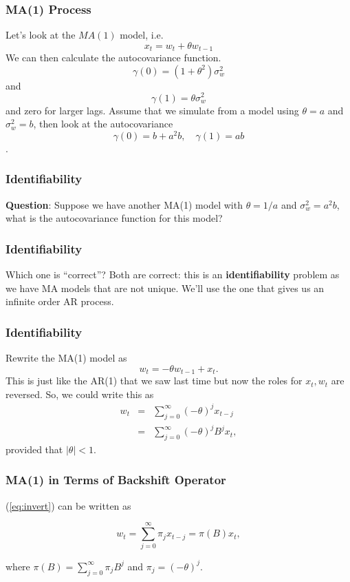 \documentclass[%
xcolor=pdftex]{beamer}
\begin{document}
\begin{frame}
\frametitle{MA(1) Process}

Let's look at the $MA(1)$ model, i.e.
 $$
 x_t=w_t+ \theta w_{t-1}
 $$
 We can then calculate the autocovariance function.
 $$
 \gamma(0)=(1+\theta^2) \sigma_w^2
 $$
 and
 $$
 \gamma(1)=\theta \sigma_w^2
 $$
 and zero for larger lags.
 Assume that we simulate from a model using $\theta=a$ and $\sigma_w^2=b$, then look at the autocovariance
 $$ \gamma(0)=b+a^2 b, \quad  \gamma(1)=a b $$.

\end{frame}

\begin{frame}
\frametitle{Identifiability}

\textbf{Question}: Suppose we have another MA(1) model with $\theta=1/a$ and $\sigma_w^2=a^2 b$, what is the autocovariance function for this model?

\vspace{40mm}
\end{frame}

\begin{frame}
\frametitle{Identifiability}

 Which one is ``correct''?  Both are correct: this is an \textbf{identifiability} problem as we have MA models that are not unique. We'll use the one that gives us an infinite order AR process.

 \end{frame}


 \begin{frame}
\frametitle{Identifiability}

 Rewrite the MA(1) model as
 $$
 w_t=-\theta w_{t-1}+x_t.
 $$
 This is just like the AR(1) that we saw last time but now the roles for $x_t, w_t$ are reversed.  So, we could write this as
\begin{eqnarray} \label{eq:invert}
 w_t &=& \sum_{j=0}^\infty (-\theta)^j x_{t-j} \nonumber\\
     &=& \sum_{j=0}^\infty (-\theta)^j B^j x_{t},
\end{eqnarray}
 provided that $|\theta|<1$.

\end{frame}

 \begin{frame}
\frametitle{MA(1) in Terms of Backshift Operator}
(\ref{eq:invert}) can be written as

\begin{equation}
 w_t=\sum_{j=0}^\infty \pi_j x_{t-j} = \pi(B) x_{t},
\end{equation}

where $\pi(B) = \sum_{j=0}^\infty \pi_j B^j$ and $\pi_j = (-\theta)^j$.

\end{frame}
\end{document}
